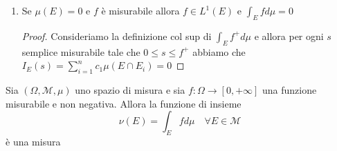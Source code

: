 \begin{enumerate}[label = \arabic*.]
    \begin{proof}
        Abbiamo che \(\int_E f^{+} d\mu\) e \(\int_E f^{-} d\mu\) sono entrambi
        finiti e \[\int_A f^{+} d\mu = \int_E f^{+} \rchi_A d\mu \le \int_E
        f^{+} d\mu\] Similmente per \(f^{-}\).
    \end{proof}
    \item Se \(\mu(E) = 0\) e \(f\) è misurabile allora \(f \in L^{1}(E)\) e
        \(\int_E f d\mu = 0\)
    \begin{proof}
        Consideriamo la definizione col sup di \(\int_E f^{+} d\mu\) e allora
        per ogni \(s\) semplice misurabile tale che \(0 \le s \le f^{+}\)
        abbiamo che \\\(I_E(s) = \sum_{i=1}^{n} c_{1} \mu(E \cap E_{i}) = 0 \) 
    \end{proof}

\end{enumerate}
\begin{theorem}\label{thm:gen_mis}
    Sia \((\Omega, \mathcal{M}, \mu)\) uno spazio di misura e sia \(f : \Omega
    \rightarrow [0, +\infty]\) una funzione misurabile e non negativa. Allora la
    funzione di insieme 
    \[
        \nu(E) = \int_E f d\mu \quad \forall E \in \mathcal{M}
    \]
    è una misura
\end{theorem}
